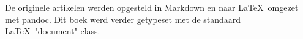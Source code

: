 \mbox{}
\vfill
De originele artikelen werden opgesteld in Markdown
en naar \LaTeX\ omgezet met pandoc.
Dit boek werd verder getypeset met de standaard \LaTeX\ "document" class.
\doclicenseThis
